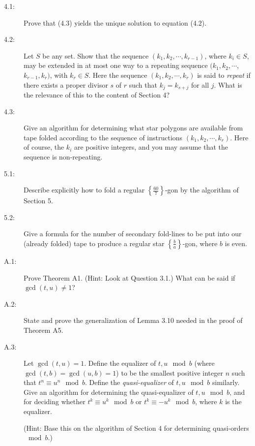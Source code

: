 \begin{description}
  \item[4.1:] Prove that (4.3) yields the unique solution to equation (4.2).

  \item[4.2:] Let $S$ be any set. Show that the sequence $(k_{1}, k_{2}, \cdots, k_{r-1})$, where $k_{i} \in S$, may be extended in at most one way to a repeating sequence $(k_{1}, k_{2}, \cdots,$ $k_{r-1}, k_{r})$, with $k_{r} \in S$. Here the sequence $(k_{1}, k_{2}, \cdots, k_{r})$ is said to \emph{repeat} if there exists a proper divisor $s$ of $r$ such that $k_{j} = k_{s+j}$ for all $j$. What is the relevance of this to the content of Section 4?

  \item[4.3:] Give an algorithm for determining what star polygons are available from tape folded according to the sequence of instructions $(k_{1}, k_{2}, \cdots, k_{r})$. Here of course, the $k_{i}$ are positive integers, and you may assume that the sequence is non-repeating.

  \item[5.1:] Describe explicitly how to fold a regular $\left\{ \frac{60}{7} \right\}$-gon by the algorithm of Section 5.

  \item[5.2:] Give a formula for the number of secondary fold-lines to be put into our (already folded) tape to produce a regular star $\left\{ \frac{b}{a} \right\}$-gon, where $b$ is even.

  \item[A.1:] Prove Theorem A1. (Hint: Look at Question 3.1.) What can be said if $\gcd(t,u) \neq 1$?

  \item[A.2:] State and prove the generalization of Lemma 3.10 needed in the proof of Theorem A5.

  \item[A.3:] Let $\gcd(t,u) = 1$. Define the equalizer of $t,u \mod{b}$ (where $\gcd(t,b) = \gcd(u,b) = 1$) to be the smallest positive integer $n$ such that $t^{n} \equiv u^{n} \mod{b}$. Define the \emph{quasi-equalizer} of $t,u \mod{b}$ similarly. Give an algorithm for determining the quasi-equalizer of $t,u \mod{b}$, and for deciding whether $t^{k} \equiv u^{k} \mod{b}$ or $t^{k} \equiv -u^{k} \mod{b}$, where $k$ is the equalizer.

    (Hint: Base this on the algorithm of Section 4 for determining quasi-orders $\mod{b}$.)

\end{description}




